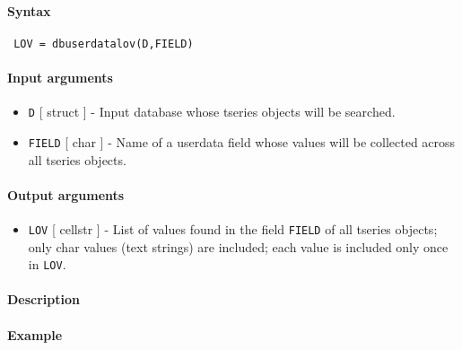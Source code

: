 


	\paragraph{Syntax}
 
 \begin{verbatim}
 LOV = dbuserdatalov(D,FIELD)
 \end{verbatim}
 
 \paragraph{Input arguments}
 
 \begin{itemize}
 \item
   \texttt{D} {[} struct {]} - Input database whose tseries objects will
   be searched.
 \item
   \texttt{FIELD} {[} char {]} - Name of a userdata field whose values
   will be collected across all tseries objects.
 \end{itemize}
 
 \paragraph{Output arguments}
 
 \begin{itemize}
 \item
   \texttt{LOV} {[} cellstr {]} - List of values found in the field
   \texttt{FIELD} of all tseries objects; only char values (text strings)
   are included; each value is included only once in \texttt{LOV}.
 \end{itemize}
 
 \paragraph{Description}
 
 \paragraph{Example}


